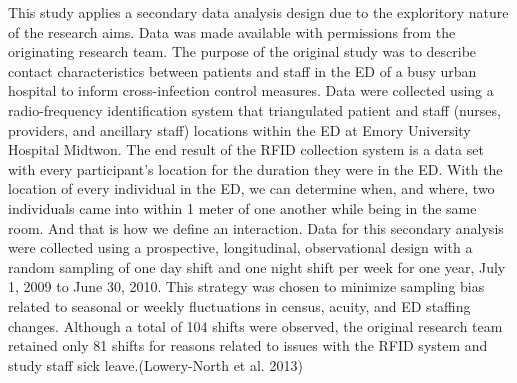 \documentclass[]{elsarticle} %
\begin{document}
This study applies a secondary data analysis design due to the
exploritory nature of the research aims. Data was made available with
permissions from the originating research team. The purpose of the
original study was to describe contact characteristics between patients
and staff in the ED of a busy urban hospital to inform cross-infection
control measures. Data were collected using a radio-frequency
identification system that triangulated patient and staff (nurses,
providers, and ancillary staff) locations within the ED at Emory
University Hospital Midtwon. The end result of the RFID collection
system is a data set with every participant's location for the duration
they were in the ED. With the location of every individual in the ED, we
can determine when, and where, two individuals came into within 1 meter
of one another while being in the same room. And that is how we define
an interaction. Data for this secondary analysis were collected using a
prospective, longitudinal, observational design with a random sampling
of one day shift and one night shift per week for one year, July 1, 2009
to June 30, 2010. This strategy was chosen to minimize sampling bias
related to seasonal or weekly fluctuations in census, acuity, and ED
staffing changes. Although a total of 104 shifts were observed, the
original research team retained only 81 shifts for reasons related to
issues with the RFID system and study staff sick leave.(Lowery-North et
al. 2013)
\end{document}
